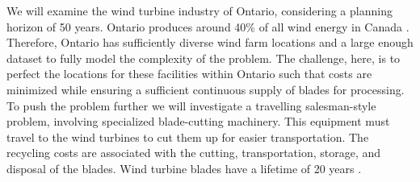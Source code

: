 We will examine the wind turbine industry of Ontario, considering a planning horizon of 50 years. Ontario produces around 40\% of all wind energy in Canada \cite{RN10}.  Therefore, Ontario has sufficiently diverse wind farm locations and a large enough dataset to fully model the complexity of the problem. The challenge, here, is to perfect the locations for these facilities within Ontario such that costs are minimized while ensuring a sufficient continuous supply of blades for processing. To push the problem further we will investigate a travelling salesman-style problem, involving specialized blade-cutting machinery. This equipment must travel to the wind turbines to cut them up for easier transportation. The recycling costs are associated with the cutting, transportation, storage, and disposal of the blades. Wind turbine blades have a lifetime of 20 years \cite{RN2}.